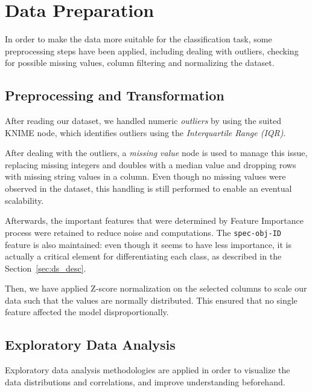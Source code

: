 \section{Data Preparation}
In order to make the data more suitable for the classification task, some preprocessing steps have been applied, including dealing with outliers, checking for possible missing values, column filtering and normalizing the dataset.
\subsection{Preprocessing and Transformation}
After reading our dataset, we handled numeric \textit{outliers} by using the suited KNIME node, which identifies outliers using the \textit{Interquartile Range (IQR)}. 

After dealing with the outliers, a \textit{missing value} node is used to manage this issue, replacing missing integers and doubles with a median value and dropping rows with missing string values in a column. Even though no missing values were observed in the dataset, this handling is still performed to enable an eventual scalability.

Afterwards, the important features that were determined by Feature Importance process were retained to reduce noise and computations. The \texttt{spec-obj-ID} feature is also maintained: even though it seems to have less importance, it is actually a critical element for differentiating each class, as described in the Section~\ref{sec:ds_desc}. 

Then, we have applied Z-score normalization on the selected columns to scale our data such that the values are normally distributed. This ensured that no single feature affected the model disproportionally.
\subsection{Exploratory Data Analysis}
Exploratory data analysis methodologies are applied in order to visualize the data distributions and correlations, and improve understanding beforehand. 

